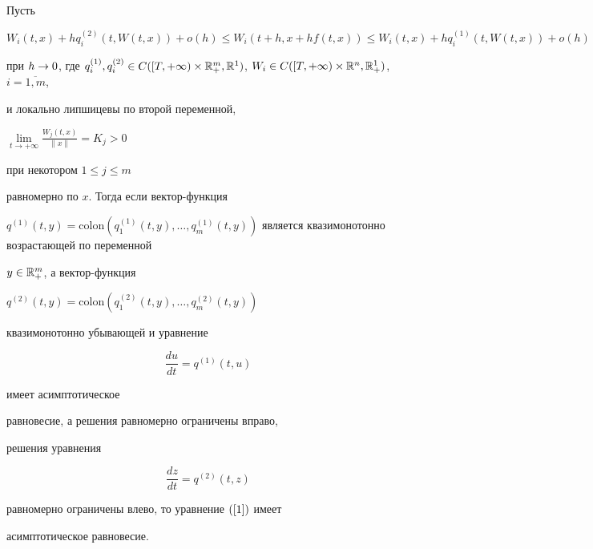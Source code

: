 \begin{thm}\label{T_9}


Пусть


$$


W_{i}(t,x)+hq_{i}^{(2)}(t,W(t,x))+ o(h) \leq 


W_{i}(t+h,x+hf(t,x)) \leq W_{i}(t,x)+hq_{i}^{(1)}(t,W(t,x))+ o


(h)


$$


при $h \rar 0$, где $q_{i}^{(1)},q_{i}^{(2)} \in C([T,


+\infty)\times \R_{+}^{m},\R^{1})$, $W_{i} \in C([T, +\infty) \times


\R^{n},\R_{+}^{1})$, $i=\overline {1,m}$, 


и локально липшицевы по второй переменной,


$\lim\limits_{t\rightarrow +\infty}\frac


{W_{j}(t,x)}{\|x\|}=K_{j}>0$ 


при некотором $1 \leq j \leq m$


равномерно по $x$. Тогда если вектор-функция


$q^{(1)}(t,y)=\mathrm{colon}(q_{1}^{(1)}(t,y),\dotsc,q_{m}^{(1)}(t,y


))$ является квазимонотонно возрастающей \cite{12} по переменной


$y\in {\Bbb R}_{+}^{m}$, а вектор-функция


$q^{(2)}(t,y)=\mathrm{colon}(q_{1}^{(2)}(t,y),\dotsc,q_{m}^{(2)}(t,y ))$


квазимонотонно убывающей и уравнение


\begin{equation}


\label{7}


\frac{du}{dt}=q^{(1)}(t,u)


\end{equation}


имеет асимптотическое


равновесие, а решения равномерно ограничены вправо,


решения уравнения


$$


\frac{dz}{dt}=q^{(2)}(t,z)


$$


равномерно ограничены влево, то уравнение $(\ref{1})$ имеет


асимптотическое равновесие.


\end{thm}






